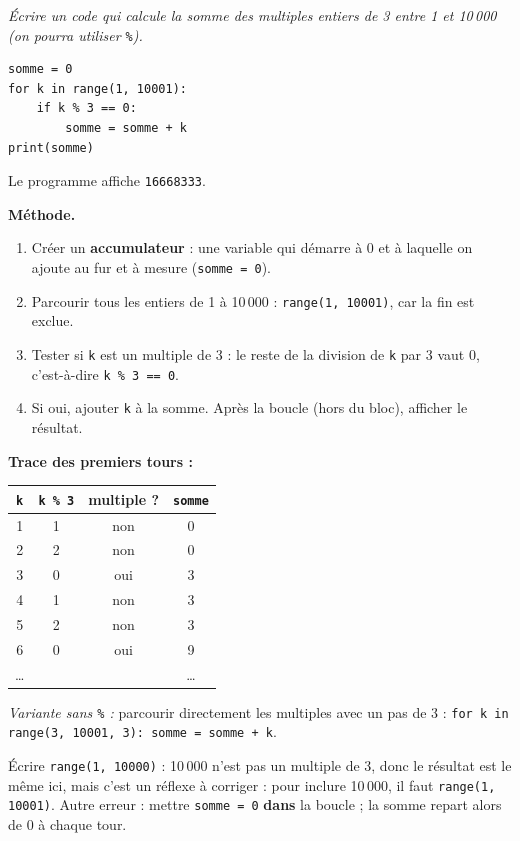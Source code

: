 \documentclass[addpoints, 11pt]{exam}
\newcommand{\enonce}[1]{\textit{#1}\par\smallskip}
\newcommand{\methode}{\par\smallskip\noindent\textbf{Méthode.}\ }
\newcommand{\code}[1]{\texttt{#1}}
\DeclareRobustCommand{\_}{\textunderscore\allowbreak}
\begin{document}
\begin{questions}
\question[3] \enonce{Écrire un code qui calcule la somme des multiples entiers de 3 entre 1 et 10\,000 (on pourra utiliser \code{\%}).}
\begin{reponse}
\begin{lstlisting}
somme = 0
for k in range(1, 10001):
    if k % 3 == 0:
        somme = somme + k
print(somme)
\end{lstlisting}
Le programme affiche \code{16668333}.
\end{reponse}
\methode
\begin{enumerate}
  \item Créer un \textbf{accumulateur} : une variable qui démarre à 0 et à laquelle on ajoute au fur et à mesure (\code{somme = 0}).
  \item Parcourir tous les entiers de 1 à 10\,000 : \code{range(1, 10001)}, car la fin est exclue.
  \item Tester si \code{k} est un multiple de 3 : le reste de la division de \code{k} par 3 vaut 0, c'est-à-dire \code{k \% 3 == 0}.
  \item Si oui, ajouter \code{k} à la somme. Après la boucle (hors du bloc), afficher le résultat.
\end{enumerate}
\textbf{Trace des premiers tours :}
\begin{center}
\begin{tabular}{|c|c|c|c|}
\hline
\code{k} & \code{k \% 3} & multiple ? & \code{somme} \\ \hline
1 & 1 & non & 0 \\
2 & 2 & non & 0 \\
3 & 0 & oui & 3 \\
4 & 1 & non & 3 \\
5 & 2 & non & 3 \\
6 & 0 & oui & 9 \\
\dots & & & \dots \\ \hline
\end{tabular}
\end{center}
\textit{Variante sans \code{\%} :} parcourir directement les multiples avec un pas de 3 : \code{for k in range(3, 10001, 3): somme = somme + k}.

\begin{erreur}
Écrire \code{range(1, 10000)} : 10\,000 n'est pas un multiple de 3, donc le résultat est le même ici, mais c'est un réflexe à corriger : pour inclure 10\,000, il faut \code{range(1, 10001)}. Autre erreur : mettre \code{somme = 0} \textbf{dans} la boucle ; la somme repart alors de 0 à chaque tour.
\end{erreur}

\end{questions}
\end{document}
